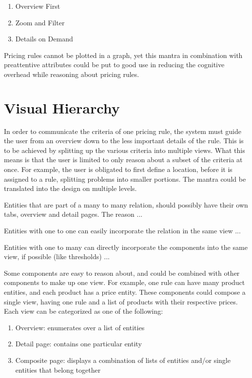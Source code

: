 \begin{enumerate}
	\item Overview First
	\item Zoom and Filter
	\item Details on Demand
\end{enumerate}

Pricing rules cannot be plotted in a graph, yet this mantra in combination with preattentive attributes could be put to good use in reducing the cognitive overhead while reasoning about pricing rules.

%
\section{Visual Hierarchy}
In order to communicate the criteria of one pricing rule, the system must guide the user from an overview down to the less important details of the rule. This is to be achieved by splitting up the various criteria into multiple views. What this means is that the user is limited to only reason about a subset of the criteria at once. For example, the user is obligated to first define a location, before it is assigned to a rule, splitting problems into smaller portions. The mantra could be translated into the design on multiple levels.

Entities that are part of a many to many relation, should possibly have their own tabs, overview and detail pages. The reason ...

Entities with one to one can easily incorporate the relation in the same view ...

Entities with one to many can directly incorporate the components into the same view, if possible (like thresholds) ...


Some components are easy to reason about, and could be combined with other components to make up one view. For example, one rule can have many product entities, and each product has a price entity. These components could compose a single view, having one rule and a list of products with their respective prices. Each view can be categorized as one of the following:

\begin{enumerate}
	\item Overview: enumerates over a list of entities
	\item Detail page: contains one particular entity
	\item Composite page: displays a combination of lists of entities and/or single entities that belong together
\end{enumerate}

